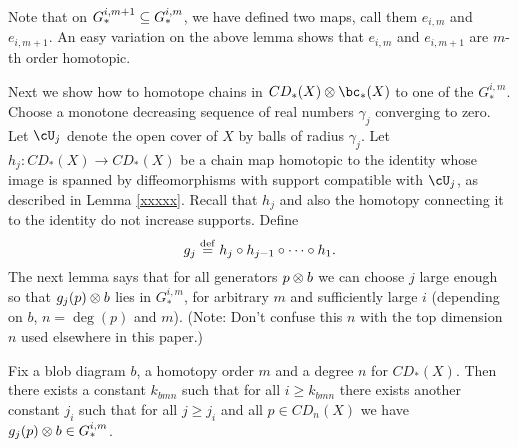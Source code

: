 Note that on $G_*^{i,m+1} \subseteq G_*^{i,m}$, we have defined two maps,
call them $e_{i,m}$ and $e_{i,m+1}$.
An easy variation on the above lemma shows that $e_{i,m}$ and $e_{i,m+1}$ are $m$-th 
order homotopic.

Next we show how to homotope chains in $CD_*(X)\ot \bc_*(X)$ to one of the 
$G_*^{i,m}$.
Choose a monotone decreasing sequence of real numbers $\gamma_j$ converging to zero.
Let $\cU_j$ denote the open cover of $X$ by balls of radius $\gamma_j$.
Let $h_j: CD_*(X)\to CD_*(X)$ be a chain map homotopic to the identity whose image is spanned by diffeomorphisms with support compatible with $\cU_j$, as described in Lemma \ref{xxxxx}.
Recall that $h_j$ and also the homotopy connecting it to the identity do not increase
supports.
Define
\[
	g_j \stackrel{\mathrm{def}}{=} h_j\circ h_{j-1} \circ \cdots \circ h_1 .
\]
The next lemma says that for all generators $p\otimes b$ we can choose $j$ large enough so that
$g_j(p)\otimes b$ lies in $G_*^{i,m}$, for arbitrary $m$ and sufficiently large $i$ 
(depending on $b$, $n = \deg(p)$ and $m$).
(Note: Don't confuse this $n$ with the top dimension $n$ used elsewhere in this paper.)

\begin{lemma} \label{Gim_approx}
Fix a blob diagram $b$, a homotopy order $m$ and a degree $n$ for $CD_*(X)$.
Then there exists a constant $k_{bmn}$ such that for all $i \ge k_{bmn}$
there exists another constant $j_i$ such that for all $j \ge j_i$ and all $p\in CD_n(X)$ 
we have $g_j(p)\otimes b \in G_*^{i,m}$.
\end{lemma}


